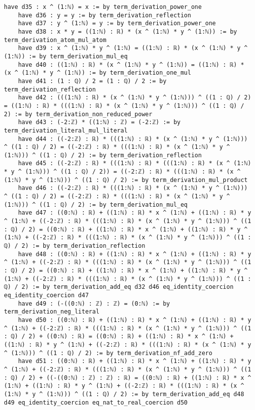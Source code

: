 \documentclass{article}
\begin{document}
\begin{tcolorbox}[colback=white!10, width=\linewidth]
\begin{lstlisting}[language=Lean4]
    have d35 : x ^ (1:ℕ) = x := by term_derivation_power_one
    have d36 : y = y := by term_derivation_reflection
    have d37 : y ^ (1:ℕ) = y := by term_derivation_power_one
    have d38 : x * y = ((1:ℕ) : ℝ) * (x ^ (1:ℕ) * y ^ (1:ℕ)) := by term_derivation_atom_mul_atom
    have d39 : x ^ (1:ℕ) * y ^ (1:ℕ) = ((1:ℕ) : ℝ) * (x ^ (1:ℕ) * y ^ (1:ℕ)) := by term_derivation_mul_eq
    have d40 : ((1:ℕ) : ℝ) * (x ^ (1:ℕ) * y ^ (1:ℕ)) = ((1:ℕ) : ℝ) * (x ^ (1:ℕ) * y ^ (1:ℕ)) := by term_derivation_one_mul
    have d41 : (1 : ℚ) / 2 = (1 : ℚ) / 2 := by term_derivation_reflection
    have d42 : (((1:ℕ) : ℝ) * (x ^ (1:ℕ) * y ^ (1:ℕ))) ^ ((1 : ℚ) / 2) = ((1:ℕ) : ℝ) * (((1:ℕ) : ℝ) * (x ^ (1:ℕ) * y ^ (1:ℕ))) ^ ((1 : ℚ) / 2) := by term_derivation_non_reduced_power
    have d43 : (-2:ℤ) * ((1:ℕ) : ℤ) = (-2:ℤ) := by term_derivation_literal_mul_literal
    have d44 : ((-2:ℤ) : ℝ) * (((1:ℕ) : ℝ) * (x ^ (1:ℕ) * y ^ (1:ℕ))) ^ ((1 : ℚ) / 2) = ((-2:ℤ) : ℝ) * (((1:ℕ) : ℝ) * (x ^ (1:ℕ) * y ^ (1:ℕ))) ^ ((1 : ℚ) / 2) := by term_derivation_reflection
    have d45 : ((-2:ℤ) : ℝ) * (((1:ℕ) : ℝ) * (((1:ℕ) : ℝ) * (x ^ (1:ℕ) * y ^ (1:ℕ))) ^ ((1 : ℚ) / 2)) = ((-2:ℤ) : ℝ) * (((1:ℕ) : ℝ) * (x ^ (1:ℕ) * y ^ (1:ℕ))) ^ ((1 : ℚ) / 2) := by term_derivation_mul_product
    have d46 : ((-2:ℤ) : ℝ) * (((1:ℕ) : ℝ) * (x ^ (1:ℕ) * y ^ (1:ℕ))) ^ ((1 : ℚ) / 2) = ((-2:ℤ) : ℝ) * (((1:ℕ) : ℝ) * (x ^ (1:ℕ) * y ^ (1:ℕ))) ^ ((1 : ℚ) / 2) := by term_derivation_mul_eq
    have d47 : ((0:ℕ) : ℝ) + ((1:ℕ) : ℝ) * x ^ (1:ℕ) + ((1:ℕ) : ℝ) * y ^ (1:ℕ) + ((-2:ℤ) : ℝ) * (((1:ℕ) : ℝ) * (x ^ (1:ℕ) * y ^ (1:ℕ))) ^ ((1 : ℚ) / 2) = ((0:ℕ) : ℝ) + ((1:ℕ) : ℝ) * x ^ (1:ℕ) + ((1:ℕ) : ℝ) * y ^ (1:ℕ) + ((-2:ℤ) : ℝ) * (((1:ℕ) : ℝ) * (x ^ (1:ℕ) * y ^ (1:ℕ))) ^ ((1 : ℚ) / 2) := by term_derivation_reflection
    have d48 : ((0:ℕ) : ℝ) + ((1:ℕ) : ℝ) * x ^ (1:ℕ) + ((1:ℕ) : ℝ) * y ^ (1:ℕ) + ((-2:ℤ) : ℝ) * (((1:ℕ) : ℝ) * (x ^ (1:ℕ) * y ^ (1:ℕ))) ^ ((1 : ℚ) / 2) = ((0:ℕ) : ℝ) + ((1:ℕ) : ℝ) * x ^ (1:ℕ) + ((1:ℕ) : ℝ) * y ^ (1:ℕ) + ((-2:ℤ) : ℝ) * (((1:ℕ) : ℝ) * (x ^ (1:ℕ) * y ^ (1:ℕ))) ^ ((1 : ℚ) / 2) := by term_derivation_add_eq d32 d46 eq_identity_coercion eq_identity_coercion d47
    have d49 : (-((0:ℕ) : ℤ) : ℤ) = (0:ℕ) := by term_derivation_neg_literal
    have d50 : ((0:ℕ) : ℝ) + ((1:ℕ) : ℝ) * x ^ (1:ℕ) + ((1:ℕ) : ℝ) * y ^ (1:ℕ) + ((-2:ℤ) : ℝ) * (((1:ℕ) : ℝ) * (x ^ (1:ℕ) * y ^ (1:ℕ))) ^ ((1 : ℚ) / 2) + ((0:ℕ) : ℝ) = ((0:ℕ) : ℝ) + ((1:ℕ) : ℝ) * x ^ (1:ℕ) + ((1:ℕ) : ℝ) * y ^ (1:ℕ) + ((-2:ℤ) : ℝ) * (((1:ℕ) : ℝ) * (x ^ (1:ℕ) * y ^ (1:ℕ))) ^ ((1 : ℚ) / 2) := by term_derivation_nf_add_zero
    have d51 : ((0:ℕ) : ℝ) + ((1:ℕ) : ℝ) * x ^ (1:ℕ) + ((1:ℕ) : ℝ) * y ^ (1:ℕ) + ((-2:ℤ) : ℝ) * (((1:ℕ) : ℝ) * (x ^ (1:ℕ) * y ^ (1:ℕ))) ^ ((1 : ℚ) / 2) + ((-((0:ℕ) : ℤ) : ℤ) : ℝ) = ((0:ℕ) : ℝ) + ((1:ℕ) : ℝ) * x ^ (1:ℕ) + ((1:ℕ) : ℝ) * y ^ (1:ℕ) + ((-2:ℤ) : ℝ) * (((1:ℕ) : ℝ) * (x ^ (1:ℕ) * y ^ (1:ℕ))) ^ ((1 : ℚ) / 2) := by term_derivation_add_eq d48 d49 eq_identity_coercion eq_nat_to_real_coercion d50

\end{lstlisting}
\end{tcolorbox}
\end{document}
